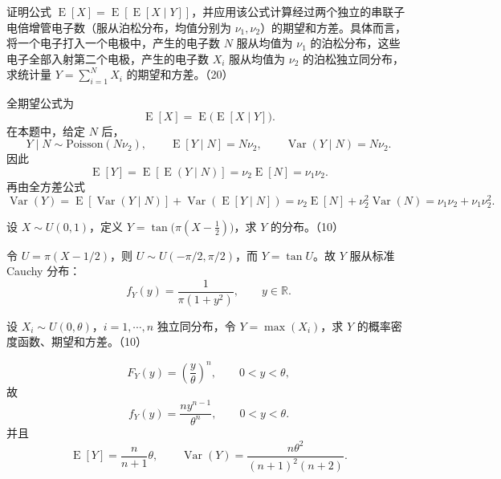 \begin{question}
证明公式 $\operatorname{E}[X]=\operatorname{E}[\operatorname{E}[X\mid Y]]$，并应用该公式计算经过两个独立的串联子电倍增管电子数（服从泊松分布，均值分别为 $\nu_1,\nu_2$）的期望和方差。具体而言，将一个电子打入一个电极中，产生的电子数 $N$ 服从均值为 $\nu_1$ 的泊松分布，这些电子全部入射第二个电极，产生的电子数 $X_i$ 服从均值为 $\nu_2$ 的泊松独立同分布，求统计量 $Y=\sum_{i=1}^{N}X_i$ 的期望和方差。（20）
\begin{solution}
全期望公式为
\[
\operatorname{E}[X]=\operatorname{E}\bigl(\operatorname{E}[X\mid Y]\bigr).
\]
在本题中，给定 $N$ 后，
\[
Y\mid N\sim \mathrm{Poisson}(N\nu_2),
\qquad \operatorname{E}[Y\mid N]=N\nu_2,
\qquad \operatorname{Var}(Y\mid N)=N\nu_2.
\]
因此
\[
\operatorname{E}[Y]=\operatorname{E}[\operatorname{E}(Y\mid N)]=\nu_2\operatorname{E}[N]=\nu_1\nu_2.
\]
再由全方差公式
\[
\operatorname{Var}(Y)=\operatorname{E}[\operatorname{Var}(Y\mid N)]+\operatorname{Var}(\operatorname{E}[Y\mid N])
=\nu_2\operatorname{E}[N]+\nu_2^2\operatorname{Var}(N)
=\nu_1\nu_2+\nu_1\nu_2^2.
\]

\end{solution}
\end{question}

\begin{question}
设 $X\sim U(0,1)$，定义 $Y=\tan\bigl(\pi(X-\frac12)\bigr)$，求 $Y$ 的分布。（10）
\begin{solution}
令 $U=\pi(X-1/2)$，则 $U\sim U(-\pi/2,\pi/2)$，而 $Y=\tan U$。故 $Y$ 服从标准 Cauchy 分布：
\[
f_Y(y)=\frac{1}{\pi(1+y^2)},\qquad y\in\mathbb R.
\]
\end{solution}
\end{question}

\begin{question}
设 $X_i\sim U(0,\theta)$，$i=1,\cdots,n$ 独立同分布，令 $Y=\max(X_i)$，求 $Y$ 的概率密度函数、期望和方差。（10）
\begin{solution}
\[
F_Y(y)=\left(\frac{y}{\theta}\right)^n,\qquad 0<y<\theta,
\]
故
\[
f_Y(y)=\frac{n y^{n-1}}{\theta^n},\qquad 0<y<\theta.
\]
并且
\[
\operatorname{E}[Y]=\frac{n}{n+1}\theta,
\qquad
\operatorname{Var}(Y)=\frac{n\theta^2}{(n+1)^2(n+2)}.
\]
\end{solution}
\end{question}

